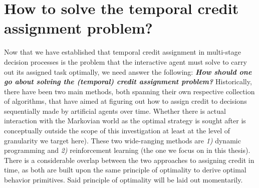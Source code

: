 \section{How to solve the temporal credit assignment problem?}

Now that we have established that temporal credit assignment in multi-stage decision processes
is the problem that the interactive agent must solve to carry out its assigned task optimally,
we need answer the following:
\textbf{\emph{How should one go about solving the (temporal) credit assignment problem?}}
Historically, there have been two main methods, both spanning their own respective collection of algorithms,
that have aimed at figuring out how to assign credit to decisions sequentially made by artificial agents over time.
Whether there is actual interaction with the Markovian world as the optimal strategy is sought after is
conceptually outside the scope of this investigation at least at the level of granularity we target here).
These two wide-ranging methods are \textit{1)} dynamic programming and
\textit{2)} reinforcement learning (the one we focus on in this thesis).
There is a considerable overlap between the two approaches to assigning credit in time,
as both are built upon the same principle of optimality to derive optimal behavior primitives.
Said principle of optimality will be laid out momentarily.

